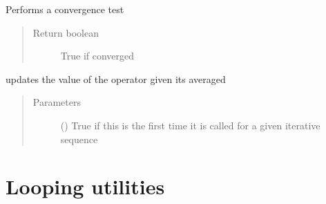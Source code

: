 \documentclass[letterpaper,10pt,english]{sphinxmanual}
\begin{document}
\begin{fulllineitems}
\begin{fulllineitems}
\label{\detokenize{utilities:pyqcm.hartree.counterterm.converged}}
\sphinxAtStartPar
Performs a convergence test
\begin{quote}\begin{description}
\item[{Return boolean}] \leavevmode
\sphinxAtStartPar
True if converged

\end{description}\end{quote}

\end{fulllineitems}


\begin{fulllineitems}
\label{\detokenize{utilities:pyqcm.hartree.counterterm.update}}
\sphinxAtStartPar
updates the value of the operator given its averaged
\begin{quote}\begin{description}
\item[{Parameters}] \leavevmode
\sphinxAtStartPar
{} () \textendash{} True if this is the first time it is called for a given iterative sequence

\end{description}\end{quote}

\end{fulllineitems}


\end{fulllineitems}



\chapter{Looping utilities}
\label{\detokenize{utilities:module-pyqcm.loop}}\label{\detokenize{utilities:looping-utilities}}
\end{document}
